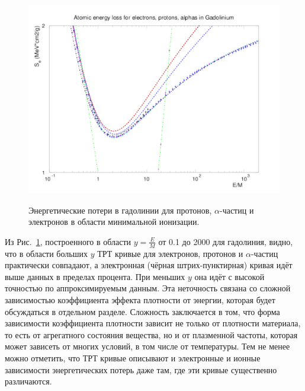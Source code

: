 \documentclass[a4paper,12pt]{article}
\begin{document}
\begin{large}
  \begin{figure}[ht]
    {
       \includegraphics[width=0.99\linewidth]{images/epa_gd_s}
    }
    \caption{Энергетические потери в гадолинии для протонов, $\alpha$-частиц и электронов в области минимальной ионизации.}
    \label{fig:dEdxGdS}
  \end{figure}
  Из Рис.~\ref{fig:dEdxGdS}, построенного в области $y=\frac{E}{M}$ от 0.1 до 2000 для гадолиния, видно, что в области больших $y$ ТРТ кривые для электронов, протонов и $\alpha$-частиц практически совпадают, а электронная (чёрная штрих-пунктирная) кривая идёт выше данных в пределах процента.
  При меньших $y$ она идёт с высокой точностью по аппроксимируемым
   данным.
  Эта неточность связана со сложной зависимостью коэффициента эффекта плотности от энергии, которая будет обсуждаться в отдельном разделе.
  Сложность заключается в том, что форма зависимости коэффициента плотности зависит не только от плотности материала, то есть от агрегатного состояния вещества, но и от плазменной частоты, которая может зависеть от многих условий, в том числе от температуры.
  Тем не менее можно отметить, что ТРТ кривые описывают и электронные и ионные зависимости энергетических потерь даже там, где эти кривые существенно различаются.
  

\end{large}
\end{document}
